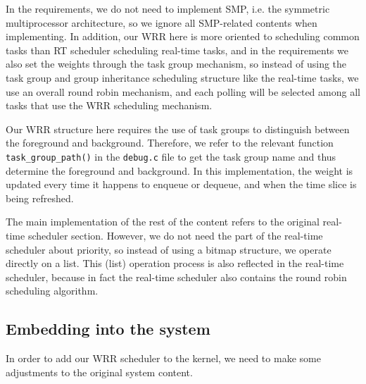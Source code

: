 \documentclass[11pt]{article}
\begin{document}
In the requirements, we do not need to implement SMP, i.e. the symmetric
multiprocessor architecture, so we ignore all SMP-related contents when
implementing. In addition, our WRR here is more oriented to scheduling
common tasks than RT scheduler scheduling real-time tasks, and in the
requirements we also set the weights through the task group mechanism,
so instead of using the task group and group inheritance scheduling
structure like the real-time tasks, we use an overall round robin
mechanism, and each polling will be selected among all tasks that use
the WRR scheduling mechanism.

Our WRR structure here requires the use of task groups to distinguish
between the foreground and background. Therefore, we refer to the
relevant function \texttt{task\_group\_path()} in the \texttt{debug.c}
file to get the task group name and thus determine the foreground and
background. In this implementation, the weight is updated every time it
happens to enqueue or dequeue, and when the time slice is being
refreshed.

The main implementation of the rest of the content refers to the
original real-time scheduler section. However, we do not need the part
of the real-time scheduler about priority, so instead of using a bitmap
structure, we operate directly on a list. This (list) operation process
is also reflected in the real-time scheduler, because in fact the
real-time scheduler also contains the round robin scheduling algorithm.

\subsection{Embedding into the
system}\label{embedding-into-the-system}

In order to add our WRR scheduler to the kernel, we need to make some
adjustments to the original system content.
\end{document}
